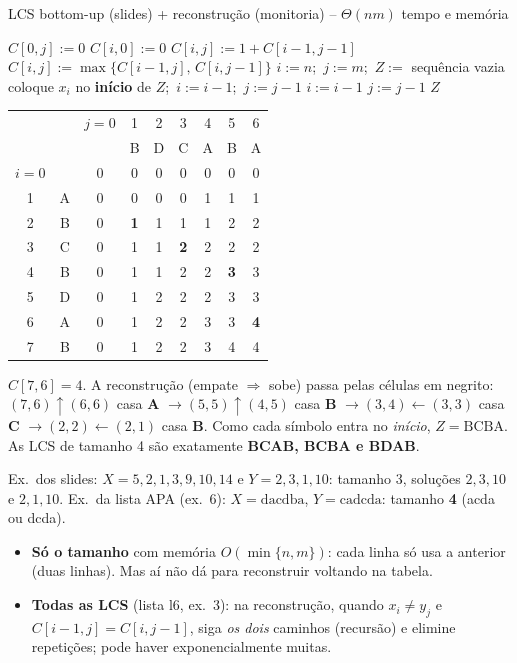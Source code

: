 \begin{pseudo}{LCS bottom-up (slides) + reconstrução (monitoria) -- $\Theta(nm)$ tempo e memória}
\begin{algorithmic}
   \State $C[0,j]:=0$ \EndFor
   \State $C[i,0]:=0$ \EndFor
       \State $C[i,j]:=1+C[i-1,j-1]$
      \Else \State $C[i,j]:=\max\{C[i-1,j],\,C[i,j-1]\}$
      \EndIf
    \EndFor
  \EndFor
  \State $i:=n$;\ $j:=m$;\ $Z:=$ sequência vazia 
     \State coloque $x_i$ no \textbf{início} de $Z$;\ $i:=i-1$;\ $j:=j-1$
     \State $i:=i-1$
    \Else \State $j:=j-1$
    \EndIf
  \EndWhile
  \State \Return $Z$ 
\EndFunction
\end{algorithmic}
\end{pseudo}

\begin{exemplo}[Monitoria: $X=\mathrm{ABCBDAB}$, $Y=\mathrm{BDCABA}$ --- conferido]\leavevmode
\begin{center}\small
\begin{tabular}{cc|ccccccc}
 & & $j{=}0$ & 1 & 2 & 3 & 4 & 5 & 6\\
 & & & B & D & C & A & B & A\\ \hline
$i{=}0$ & & 0&0&0&0&0&0&0\\
1 & A & 0&0&0&0&1&1&1\\
2 & B & 0&\textbf{1}&1&1&1&2&2\\
3 & C & 0&1&1&\textbf{2}&2&2&2\\
4 & B & 0&1&1&2&2&\textbf{3}&3\\
5 & D & 0&1&2&2&2&3&3\\
6 & A & 0&1&2&2&3&3&\textbf{4}\\
7 & B & 0&1&2&2&3&4&4\\
\end{tabular}
\end{center}
$C[7,6]=4$. A reconstrução (empate $\Rightarrow$ sobe) passa pelas células em negrito: $(7,6)\uparrow(6,6)$ casa \textbf{A} $\to(5,5)\uparrow(4,5)$ casa \textbf{B} $\to(3,4)\leftarrow(3,3)$ casa \textbf{C} $\to(2,2)\leftarrow(2,1)$ casa \textbf{B}. Como cada símbolo entra no \emph{início}, $Z=\mathrm{BCBA}$. As LCS de tamanho 4 são exatamente \textbf{BCAB, BCBA e BDAB}.
\end{exemplo}
Ex.\ dos slides: $X=5,2,1,3,9,10,14$ e $Y=2,3,1,10$: tamanho 3, soluções $2,3,10$ e $2,1,10$. Ex.\ da lista APA (ex.~6): $X=\mathrm{dacdba}$, $Y=\mathrm{cadcda}$: tamanho \textbf{4} (\textrm{acda} ou \textrm{dcda}).
\begin{itemize}
  \item \textbf{Só o tamanho} com memória $O(\min\{n,m\})$: cada linha só usa a anterior (duas linhas). Mas aí não dá para reconstruir voltando na tabela.
  \item \textbf{Todas as LCS} (lista l6, ex.~3): na reconstrução, quando $x_i\ne y_j$ e $C[i-1,j]=C[i,j-1]$, siga \emph{os dois} caminhos (recursão) e elimine repetições; pode haver exponencialmente muitas.
\end{itemize}

